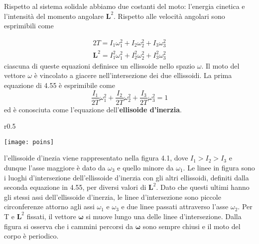 Rispetto al sistema solidale abbiamo due costanti del moto: l'energia cinetica e l'intensit\`{a} del momento angolare $\bm{L}^2$. Rispetto alle velocit\`{a} angolari sono esprimibili come

\begin{equation}
	\begin{array}{l}
		2T = I_1 \omega_1^2 + I_2 \omega_2^2+I_3\omega_3^2 \\
		\bm{L}^2 = I_1^2 \omega_1^2 + I_2^2 \omega_2^2+I_3^2 \omega_3^2 
	\end{array}
\end{equation}
ciascuna di queste equazioni definisce un ellissoide nello spazio $\omega$. Il moto del vettore $\omega$ \`{e} vincolato a giacere nell'intersezione dei due ellissoidi. La prima equazione di 4.55 \`{e} esprimibile come 
\begin{equation}
\frac{I_1}{2 T} \omega_1^2+\frac{I_2}{2 T} \omega_2^2+\frac{I_3}{2 T} \omega_3^2=1
\end{equation}
ed \`{e} conosciuta come l'equazione dell'\textbf{ellisoide d'inerzia}.

\begin{wrapfigure}{r}{0.5\textwidth}
  \begin{center}
    \texttt{[image: poins]}
  \end{center}
  \caption{}
\end{wrapfigure}
\noindent l'ellissoide d'inezia viene rappresentato nella figura 4.1, dove $I_1 > I_2 > I_3$ e dunque l'asse maggiore \`{e} dato da $\omega_3$ e quello minore da $\omega_1$. Le linee in figura sono i luoghi d'intersezione dell'ellissoide d'inerzia con gli altri ellissoidi, definiti dalla seconda equazione in 4.55, per diversi valori di $\bm{L}^2$. Dato che questi ultimi hanno gli stessi assi dell'ellissoide d'inerzia, le linee d'intersezione sono piccole circonferenze attorno agli assi $
\omega_1$ e $\omega_3$ e due linee passati attraverso l'asse $\omega_2$. Per T e $\bm{L}^2$ fissati, il vettore $\bm{\omega}$ si muove lungo una delle linee d'intersezione. Dalla figura si osserva che i cammini percorsi da $\bm{\omega}$ sono sempre chiusi e il moto del corpo \`{e} periodico. \newline

